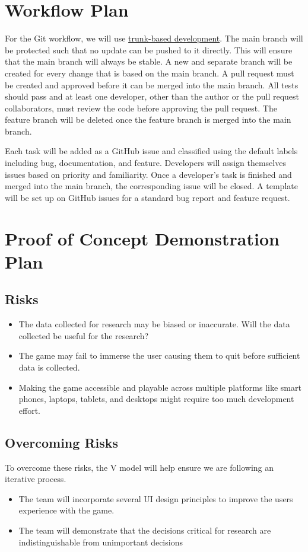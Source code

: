 \documentclass{article}
\begin{document}
\section{Workflow Plan}
For the Git workflow, we will use \href{https://www.atlassian.com/continuous-delivery/continuous-integration/trunk-based-development}{trunk-based development}. The main branch will be protected such that no update can be pushed to it directly. This will ensure that the main branch will always be stable. 
A new and separate branch will be created for every change that is based on the main branch. A pull request must be created and approved before it can be merged into the main branch. All tests should pass and at least one developer, other than the author or the pull request collaborators, must review the code before approving the pull request. The feature branch will be deleted once the feature branch is merged into the main branch.

Each task will be added as a GitHub issue and classified using the default labels including bug, documentation, and feature. Developers will assign themselves issues based on priority and familiarity. Once a developer's task is finished and merged into the main branch, the corresponding issue will be closed. A template will be set up on GitHub issues for a standard bug report and feature request.

\section{Proof of Concept Demonstration Plan}
\subsection{Risks}
\begin{itemize}
    \item The data collected for research may be biased or inaccurate. Will the data collected be useful for the research?
    \item The game may fail to immerse the user causing them to quit before sufficient data is collected.
    \item Making the game accessible and playable across multiple platforms like smart phones, laptops, tablets, and desktops might require too much development effort.
\end{itemize}

\subsection{Overcoming Risks}
To overcome these risks, the V model will help ensure we are following an iterative process.
\begin{itemize}
    \item The team will incorporate several UI design principles to improve the users experience with the game.
    \item The team will demonstrate that the decisions critical for research are indistinguishable from unimportant decisions
\end{itemize}
\end{document}
